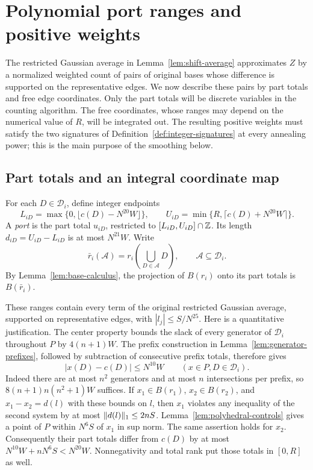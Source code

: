 \section{Polynomial port ranges and positive weights}\label{sec:ports}

The restricted Gaussian average in Lemma~\ref{lem:shift-average}
approximates $Z$ by a normalized weighted count of pairs of original
bases whose difference is supported on the representative edges. We now
describe these pairs by part totals and free edge coordinates. Only the
part totals will be discrete variables in the counting algorithm. The
free coordinates, whose ranges may depend on the numerical value of $R$,
will be integrated out. The resulting positive weights must satisfy the
two signatures of Definition~\ref{def:integer-signatures} at every
annealing power; this is the main purpose of the smoothing below.

\subsection{Part totals and an integral coordinate map}

For each $D\in\mathcal D_i$, define integer endpoints
\[
 L_{iD}=\max\{0,\lfloor c(D)-N^{20}W\rfloor\},\qquad
 U_{iD}=\min\{R,\lceil c(D)+N^{20}W\rceil\}.
\]
A \emph{port} is the part total $u_{iD}$, restricted to
$[L_{iD},U_{iD}]\cap\mathbb Z$. Its length
$d_{iD}=U_{iD}-L_{iD}$ is at most $N^{21}W$. Write
\[
 \bar r_i(\mathcal A)=r_i\left(\bigcup_{D\in\mathcal A}D\right),
 \qquad \mathcal A\subseteq\mathcal D_i.
\]
By Lemma~\ref{lem:base-calculus}, the projection of $B(r_i)$ onto its
part totals is $B(\bar r_i)$.

These ranges contain every term of the original restricted Gaussian
average, supported on representative edges, with
$|l_j|\le S/N^{25}$. Here is a quantitative justification. The center
property bounds the slack of every generator of $\mathcal D_i$ throughout
$P$ by $4(n+1)W$. The prefix construction in
Lemma~\ref{lem:generator-prefixes}, followed by subtraction of consecutive
prefix totals, therefore gives
\begin{equation}\label{eq:part-total-range}
 |x(D)-c(D)|\le N^{10}W\qquad(x\in P, D\in\mathcal D_i).
\end{equation}
Indeed there are at most $n^2$ generators and at most $n$ intersections
per prefix, so $8(n+1)n(n^2+1)W$ suffices. If
$x_1\in B(r_1)$, $x_2\in B(r_2)$, and
$x_1-x_2=d(l)$ with these bounds on $l$, then $x_1$ violates any
inequality of the second system by at most $\lVert d(l)\rVert_1\le 2nS$.
Lemma~\ref{lem:polyhedral-controls} gives a point of $P$ within
$N^6S$ of $x_1$ in sup norm. The same assertion holds for $x_2$.
Consequently their part totals differ from $c(D)$ by at most
$N^{10}W+nN^6S<N^{20}W$. Nonnegativity and total rank put those totals
in $[0,R]$ as well.

